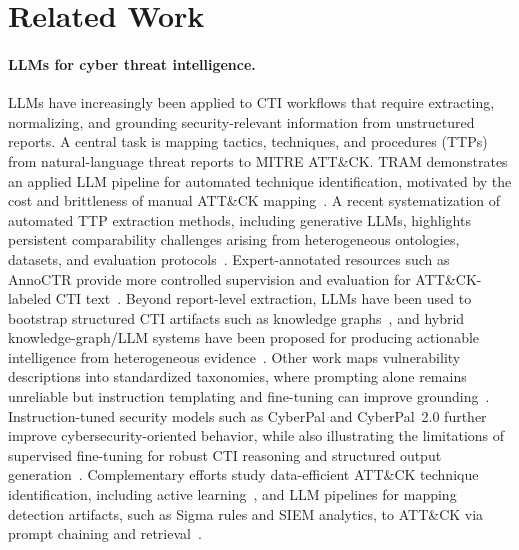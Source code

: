 \section{Related Work}
\label{sec:related-work}

\paragraph{LLMs for cyber threat intelligence.}
LLMs have increasingly been applied to CTI workflows that require extracting, normalizing, and grounding security-relevant information from unstructured reports. A central task is mapping tactics, techniques, and procedures (TTPs) from natural-language threat reports to MITRE ATT\&CK. TRAM demonstrates an applied LLM pipeline for automated technique identification, motivated by the cost and brittleness of manual ATT\&CK mapping~\citep{ctid2023tram}. A recent systematization of automated TTP extraction methods, including generative LLMs, highlights persistent comparability challenges arising from heterogeneous ontologies, datasets, and evaluation protocols~\citep{buechel2025sok_ttp}. Expert-annotated resources such as AnnoCTR provide more controlled supervision and evaluation for ATT\&CK-labeled CTI text~\citep{lange2024annoctr}. Beyond report-level extraction, LLMs have been used to bootstrap structured CTI artifacts such as knowledge graphs~\citep{hu2024llm_tikg}, and hybrid knowledge-graph/LLM systems have been proposed for producing actionable intelligence from heterogeneous evidence~\citep{DBLP:conf/eurosp/FieblingerAR24}. Other work maps vulnerability descriptions into standardized taxonomies, where prompting alone remains unreliable but instruction templating and fine-tuning can improve grounding~\citep{liu2023not_end_of_story,zhang2024vtt_llm}. Instruction-tuned security models such as CyberPal and CyberPal~2.0 further improve cybersecurity-oriented behavior, while also illustrating the limitations of supervised fine-tuning for robust CTI reasoning and structured output generation~\citep{levi2024cyberpal,levi2025cyberpal2}. Complementary efforts study data-efficient ATT\&CK technique identification, including active learning~\citep{rahman2024alert}, and LLM pipelines for mapping detection artifacts, such as Sigma rules and SIEM analytics, to ATT\&CK via prompt chaining and retrieval~\citep{wudali2025ram}.

